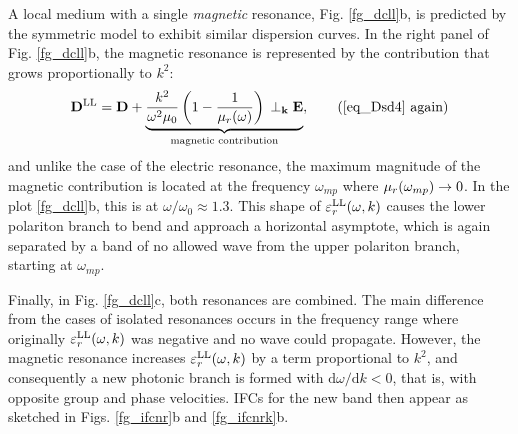 A local medium with a single \textit{magnetic} resonance, Fig. \ref{fg_dcll}b, is predicted by the symmetric model to exhibit similar dispersion curves. In the right panel of Fig. \ref{fg_dcll}b, the magnetic resonance is represented by the
contribution that grows proportionally to $k^2$: 
\begin{equation} \Dsd = \D + \underbrace{\frac{k^2}{\omega^2 \mu_0}\left(1 - \frac{1}{\murl(\omega)}\right) \, \TT \E}_{\text{magnetic contribution}},      \tag{\ref{eq_Dsd4} \again} \end{equation}
and unlike the case of the electric resonance, the maximum magnitude of the magnetic contribution is located at the frequency $\omega_{mp}$ where $\mu_r(\omega_{mp}) \rightarrow 0$. In the plot \ref{fg_dcll}b, this is at $\omega/\omega_0 \approx 1.3$.
This shape of $\varepsilon_r^\text{LL}(\omega, k)$ causes the lower polariton branch to bend and approach a horizontal asymptote, which is again separated by a band of no allowed wave from the upper polariton branch, starting at $\omega_{mp}$.

Finally, in Fig. \ref{fg_dcll}c, both resonances are combined. The main difference from the cases of isolated resonances occurs in the frequency range where originally $\varepsilon_r^\text{LL}(\omega, k)$ was negative and no wave could propagate. %
However, the magnetic resonance increases $\varepsilon_r^\text{LL}(\omega, k)$ by a term proportional to $k^2$, and consequently a new photonic branch is formed with $\mathrm{d}\omega/\mathrm{d}k < 0$, that is, with opposite group and phase velocities. IFCs for the new band then appear as sketched in Figs. \ref{fg_ifcnr}b and \ref{fg_ifcnrk}b.



